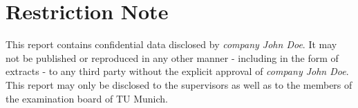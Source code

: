 \chapter*{Restriction Note}
%
This report contains confidential data disclosed by \textit{company John Doe}. It may not be published or reproduced in any other manner - including in
the form of extracts - to any third party without the explicit approval of \textit{company John Doe}. This report may only be disclosed to the supervisors as well as to the
members of the examination board of TU Munich.
%
\cleardoublepage
%